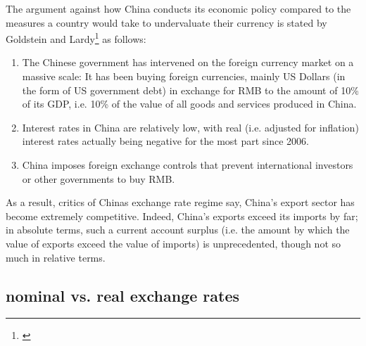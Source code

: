 \documentclass[11pt]{article}
\begin{document}
The argument against how China conducts its economic policy compared to 
the measures a country would take to undervaluate their currency is 
stated by Goldstein and Lardy\footnote{\cite[pp.  
40]{GoldsteinLardy2008}} as follows:

\begin{enumerate}
\item{The Chinese government has intervened on the foreign currency 
		market on a massive scale: It has been buying foreign 
		currencies, mainly US Dollars (in the form of US government 
		debt) in exchange for RMB to the amount of 10\% of its GDP, i.e. 
		10\% of the value of all goods and services produced in China.} 
\item{Interest rates in China are relatively low, with real (i.e. adjusted for inflation) interest rates actually being negative for the most part since 2006.} %
\item{China imposes foreign exchange controls that prevent international investors or other governments to buy RMB.}%
\end{enumerate}

As a result, critics of Chinas exchange rate regime say, China's export sector has become extremely competitive. Indeed, China's exports exceed its imports by far; in absolute terms, such a current account surplus (i.e. the amount by which the value of exports exceed the value of imports) is unprecedented, though not so much in relative terms. %

 
\subsection{nominal vs. real exchange rates}
\end{document}
